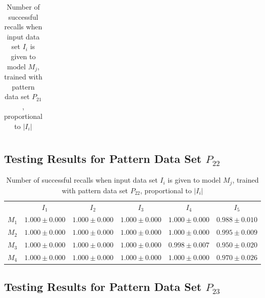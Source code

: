 \documentclass[12pt]{article}
\begin{document}
\begin{appendices}
\begin{table}[H]
\begin{tabular}{cccccc}
    \end{tabular}
    \caption{Number of successful recalls when input data set $I_i$ is given to model $M_j$, trained with pattern data set $P_{21}$, proportional to $\left|I_i\right|$}
    \end{table}
    
\subsection{Testing Results for Pattern Data Set $P_{22}$}


    \begin{table}[H]
    \centering
    \def\arraystretch{1.5}
    \footnotesize
    \begin{tabular}{cccccc}
    
 & $I_{1}$  & $I_{2}$  & $I_{3}$  & $I_{4}$  & $I_{5}$ \\ \cline{2-6}
$M_{1}$  & $1.000\pm0.000$  & $1.000\pm0.000$  & $1.000\pm0.000$  & $1.000\pm0.000$  & $0.988\pm0.010$ \\
$M_{2}$  & $1.000\pm0.000$  & $1.000\pm0.000$  & $1.000\pm0.000$  & $1.000\pm0.000$  & $0.995\pm0.009$ \\
$M_{3}$  & $1.000\pm0.000$  & $1.000\pm0.000$  & $1.000\pm0.000$  & $0.998\pm0.007$  & $0.950\pm0.020$ \\
$M_{4}$  & $1.000\pm0.000$  & $1.000\pm0.000$  & $1.000\pm0.000$  & $1.000\pm0.000$  & $0.970\pm0.026$ \\

    \end{tabular}
    \caption{Number of successful recalls when input data set $I_i$ is given to model $M_j$, trained with pattern data set $P_{22}$, proportional to $\left|I_i\right|$}
    \end{table}
    
\subsection{Testing Results for Pattern Data Set $P_{23}$}


    \begin{table}[H]
    \centering
    \def\arraystretch{1.5}
    \footnotesize
    \begin{tabular}{cccccc}
    

\end{tabular}
\end{table}
\end{appendices}
\end{document}
